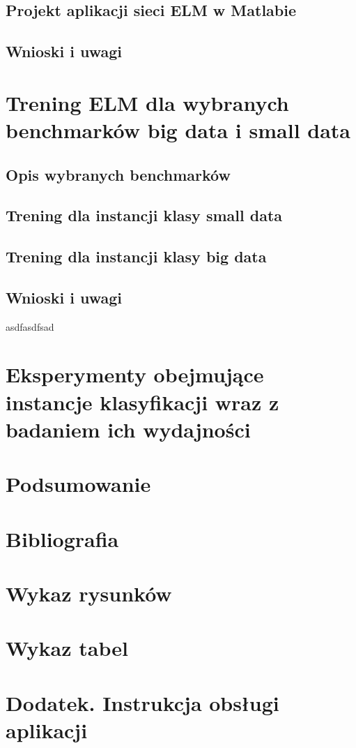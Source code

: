 \documentclass{article}
\begin{document}
\subsection{Projekt aplikacji sieci ELM w Matlabie}
\subsection{Wnioski i uwagi}
\section{Trening ELM dla wybranych benchmarków big data i small data}
\subsection{Opis wybranych benchmarków}
\subsection{Trening dla instancji klasy small data}
\subsection{Trening dla instancji klasy big data}
\subsection{Wnioski i uwagi}
asdfasdfsad
\section{Eksperymenty obejmujące instancje klasyfikacji wraz z badaniem ich wydajności}
\section*{Podsumowanie}
\section*{Bibliografia}
\section*{Wykaz rysunków}
\section*{Wykaz tabel}
\section*{Dodatek. Instrukcja obsługi aplikacji}
\end{document}
